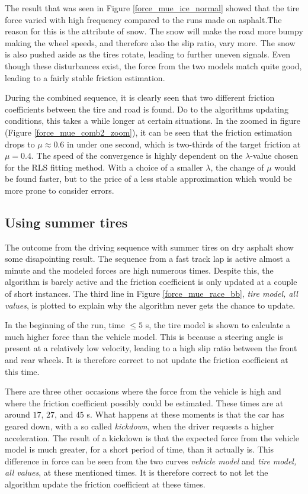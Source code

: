 The result that was seen in Figure \ref{force_mue_ice_normal} showed that the tire force varied with high frequency compared to the runs made on asphalt.The reason for this is the attribute of snow. The snow will make the road more bumpy making the wheel speeds, and therefore also the slip ratio, vary more. The snow is also pushed aside as the tires rotate, leading to further uneven signals. Even though these disturbances exist, the force from the two models match quite good, leading to a fairly stable friction estimation. 

During the combined sequence, it is clearly seen that two different friction coefficients between the tire and road is found. Do to the algorithms updating conditions, this takes a while longer at certain situations. In the zoomed in figure (Figure \ref{force_mue_comb2_zoom}), it can be seen that the friction estimation drops to $ \mu \approx 0.6 $ in under one second, which is two-thirds of the target friction at $ \mu = 0.4 $. The speed of the convergence is highly dependent on the $ \lambda $-value chosen for the RLS fitting method. With a choice of a smaller $ \lambda $, the change of $ \mu $ would be found faster, but to the price of a less stable approximation which would be more prone to consider errors. 

\subsection{Using summer tires}
The outcome from the driving sequence with summer tires on dry asphalt show some disapointing result. The sequence from a fast track lap is active almost a minute and the modeled forces are high numerous times. Despite this, the algorithm is barely active and the friction coefficient is only updated at a couple of short instances. The third line in Figure \ref{force_mue_race_bb}, \textit{tire model, all values}, is plotted to explain why the algorithm never gets the chance to update.

In the beginning of the run, time $ \leq 5 $ s, the tire model is shown to calculate a much higher force than the vehicle model. This is because a steering angle is present at a relatively low velocity, leading to a high slip ratio between the front and rear wheels. It is therefore correct to not update the friction coefficient at this time. 

There are three other occasions where the force from the vehicle is high and where the friction coefficient possibly could be estimated. These times are at around $ 17 $, $ 27 $, and $ 45 $ s. What happens at these moments is that the car has geared down, with a so called \textit{kickdown}, when the driver requests a higher acceleration. The result of a kickdown is that the expected force from the vehicle model is much greater, for a short period of time, than it actually is. This difference in force can be seen from the two curves \textit{vehicle model} and \textit{tire model, all values}, at these mentioned times. It is therefore correct to not let the algorithm update the friction coefficient at these times.

